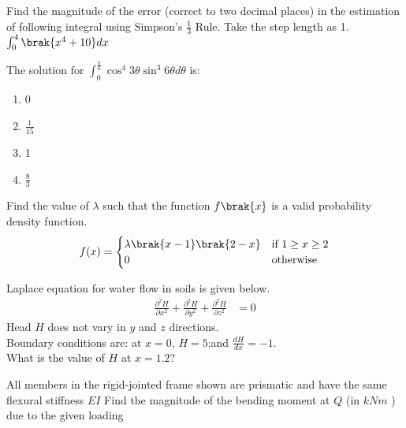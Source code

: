\iffalse	
	\chapter{2013}
	\author{AI24BTECH11016}
	\section{ce}
\fi

\item
	Find the magnitude of the error (correct to two decimal places) in the estimation of following integral using Simpson's $\frac{1}{3}$ Rule. Take the step length as 1. \\
	$\int_{0}^{4} \brak{x^{4}+10} dx$
	\item
	The solution for $\int_{0}^{\frac{\pi}{6}} \cos^{4}{3\theta}\sin^{3}{6\theta} d\theta$ is:
		\begin{enumerate}
			\item 0
			\item $\frac{1}{15}$
			\item 1
			\item $\frac{8}{3}$
		\end{enumerate}
	\item
	Find the value of $\lambda$ such that the function $f\brak{x}$ is a valid probability density function.
		\begin{align*}
			f(x) =
			\begin{cases}
  				\lambda\brak{x-1}\brak{2-x} & \text{if } 1 \geq x \geq 2 \\
  				0 & \text{otherwise }
			\end{cases}
		\end{align*}
	\item
	Laplace equation for water flow in soils is given below.
		\begin{align*}
			\frac{\partial^2 H}{\partial x^2} + \frac{\partial^2 H}{\partial y^2} + \frac{\partial^2 H}{\partial z^2} &= 0
		\end{align*}
	Head $H$ does not vary in $y$ and $z$ directions. \\
	Boundary conditions are: at $x = 0$, $H = 5$;and $\frac{dH}{dx} = -1$. \\
	What is the value of $H$ at $x = 1.2$?
	\item
	All members in the rigid-jointed frame shown are prismatic and have the same flexural stiffness $EI$
Find the magnitude of the bending moment at $Q$ (in $kNm$ ) due to the given loading


